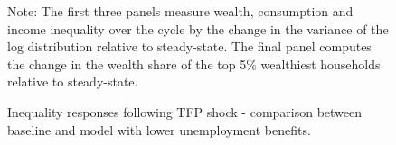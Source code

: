 \begin{figure}[H]
\caption[Caption for LOF]{Inequality responses following TFP shock - comparison between baseline and model with lower unemployment benefits.}
\label{fig:Inequality_response_lower_b}
\centering
 {\scriptsize  Note: The first three panels measure wealth, consumption and income inequality over the cycle by the change in the variance of the log distribution relative to steady-state. The final panel computes the change in the wealth share of the top 5\% wealthiest households relative to steady-state.  }
\end{figure}

